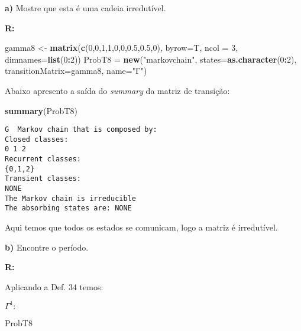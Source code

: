 \documentclass[
]{article}
\newenvironment{Shaded}{\begin{snugshade}}{\end{snugshade}}
\newcommand{\DataTypeTok}[1]{\textcolor[rgb]{0.13,0.29,0.53}{#1}}
\newcommand{\DecValTok}[1]{\textcolor[rgb]{0.00,0.00,0.81}{#1}}
\newcommand{\FloatTok}[1]{\textcolor[rgb]{0.00,0.00,0.81}{#1}}
\newcommand{\KeywordTok}[1]{\textcolor[rgb]{0.13,0.29,0.53}{\textbf{#1}}}
\newcommand{\NormalTok}[1]{#1}
\newcommand{\OperatorTok}[1]{\textcolor[rgb]{0.81,0.36,0.00}{\textbf{#1}}}
\newcommand{\StringTok}[1]{\textcolor[rgb]{0.31,0.60,0.02}{#1}}
\begin{document}
\textbf{a)} Mostre que esta é uma cadeia irredutível.

\textbf{R:}

\begin{Shaded}
\begin{Highlighting}[]
\NormalTok{gamma8 <-}\StringTok{ }\KeywordTok{matrix}\NormalTok{(}\KeywordTok{c}\NormalTok{(}\DecValTok{0}\NormalTok{,}\DecValTok{0}\NormalTok{,}\DecValTok{1}\NormalTok{,}\DecValTok{1}\NormalTok{,}\DecValTok{0}\NormalTok{,}\DecValTok{0}\NormalTok{,}\FloatTok{0.5}\NormalTok{,}\FloatTok{0.5}\NormalTok{,}\DecValTok{0}\NormalTok{), }\DataTypeTok{byrow=}\NormalTok{T, }\DataTypeTok{ncol =} \DecValTok{3}\NormalTok{, }\DataTypeTok{dimnames=}\KeywordTok{list}\NormalTok{(}\DecValTok{0}\OperatorTok{:}\DecValTok{2}\NormalTok{))}
\NormalTok{ProbT8 =}\StringTok{ }\KeywordTok{new}\NormalTok{(}\StringTok{"markovchain"}\NormalTok{, }\DataTypeTok{states=}\KeywordTok{as.character}\NormalTok{(}\DecValTok{0}\OperatorTok{:}\DecValTok{2}\NormalTok{), }\DataTypeTok{transitionMatrix=}\NormalTok{gamma8, }\DataTypeTok{name=}\StringTok{"Γ"}\NormalTok{)}
\end{Highlighting}
\end{Shaded}

Abaixo apresento a saída do \emph{summary} da matriz de transição:

\begin{Shaded}
\begin{Highlighting}[]
\KeywordTok{summary}\NormalTok{(ProbT8)}
\end{Highlighting}
\end{Shaded}

\begin{verbatim}
G  Markov chain that is composed by: 
Closed classes: 
0 1 2 
Recurrent classes: 
{0,1,2}
Transient classes: 
NONE 
The Markov chain is irreducible 
The absorbing states are: NONE
\end{verbatim}

Aqui temos que todos os estados se comunicam, logo a matriz é
irredutível.

\textbf{b)} Encontre o período.

\textbf{R:}

Aplicando a Def. 34 temos:

\(\Gamma^1:\)

\begin{Shaded}
\begin{Highlighting}[]
\NormalTok{ProbT8}
\end{Highlighting}
\end{Shaded}
\end{document}
